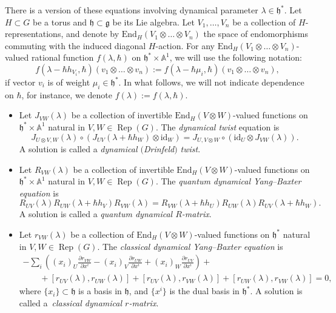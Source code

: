 \documentclass[10pt,a4paper]{amsart}
\numberwithin{equation}{section}
\newcommand{\g}{\mathfrak{g}}
\newcommand{\h}{\mathfrak{h}}
\newcommand{\End}{\mathrm{End}}
\newcommand{\id}{\mathrm{id}}
\DeclareMathOperator{\Rep}{Rep}
\begin{document}
	There is a version of these equations involving dynamical parameter $\lambda \in \h^*$. Let $H \subset G$ be a torus and $\h \subset \g$ be its Lie algebra. Let $V_1,\dots,V_n$ be a collection of $H$-representations, and denote by $\End_{H}(V_1 \otimes \dots \otimes V_n)$ the space of endomorphisms commuting with the induced diagonal $H$-action. For any $\End_{H}(V_1 \otimes \dots \otimes V_n)$-valued rational function $f(\lambda,\hbar)$ on $\h^*\times \mathbb{A}^1$, we will use the following notation:
	\[
	f(\lambda-\hbar h_{V_i},\hbar) (v_1 \otimes \dots \otimes v_n) := f(\lambda - \hbar \mu_i,\hbar) (v_1\otimes \dots \otimes v_n),
	\]
	if vector $v_i$ is of weight $\mu_i \in \h^*$. In what follows, we will not indicate dependence on $\hbar$, for instance, we denote $f(\lambda):=f(\lambda,\hbar)$.
	
	\begin{Definition}\qquad
		\label{def::all_dynamical}
		\begin{itemize}\itemsep=0pt
			\item Let $J_{VW}(\lambda)$ be a collection of invertible $\End_{H}(V \otimes W)$-valued functions on $\h^*\times \mathbb{A}^1$ natural in $V,W\in \Rep(G)$. The \emph{dynamical twist} equation is
			\begin{equation}
				\label{eq::dyn_twist}
				J_{U \otimes V,W}(\lambda) \circ (J_{UV}(\lambda+\hbar h_W) \otimes \id_W) = J_{U,V\otimes W} \circ (\id_U \otimes J_{VW}(\lambda)).
			\end{equation}
			A solution is called a \emph{dynamical $($Drinfeld$)$ twist}.
			\item Let $R_{VW}(\lambda)$ be a collection of invertible $\End_{H}(V \otimes W)$-valued functions on $\h^*\times \mathbb{A}^1$ natural in $V,W\in \Rep(G)$. The \emph{quantum dynamical Yang--Baxter equation} is
			\begin{equation}
				\label{eq::qdybe}
				R_{UV}(\lambda) R_{UW} (\lambda + \hbar h_V) R_{VW}(\lambda) = R_{VW}(\lambda+\hbar h_U) R_{UW}(\lambda) R_{UV}(\lambda + \hbar h_W).
			\end{equation}
			A solution is called a \emph{quantum dynamical $R$-matrix}.
			\item Let $r_{VW}(\lambda)$ be a collection of $\End_{H}(V \otimes W)$-valued functions on $\h^*$ natural in $V,W\in \Rep(G)$. The \emph{classical dynamical Yang--Baxter equation} is
			\begin{gather}
					-\sum\limits_i \left( (x_i)_{U} \frac{\partial r_{VW}}{\partial x^i} - (x_i)_V \frac{\partial r_{UW}}{\partial x^i} + (x_i)_W \frac{\partial r_{UV}}{\partial x^i}\right) +\nonumber \\
					\qquad{}+[r_{UV}(\lambda),r_{UW}(\lambda)] + [r_{UV}(\lambda),r_{VW}(\lambda)] + [r_{UW}(\lambda), r_{VW}(\lambda)] = 0,\label{eq::cdybe}
			\end{gather}
			where $\{x_i\} \subset \h$ is a basis in $\h$, and $\bigl\{x^i\bigr\}$ is the dual basis in $\h^*$. A solution is called a~\emph{classical dynamical $r$-matrix}.
		\end{itemize}
	\end{Definition}
	
\end{document}
